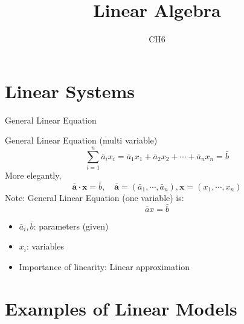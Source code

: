 \documentclass[a4paper,11pt]{article}
\author[조남운]{\mail}
\title{Linear Algebra}
\subtitle{CH6}
\begin{document}
	
\maketitle


\section{Linear Systems} %
\label{sec:linear_systems}
\begin{frame}[t]{General Linear Equation}
	\begin{block}
		{General Linear Equation (multi variable)}
		\[
			\sum_{i=1}^n \bar a_i x_i = \bar a_1 x_1 + \bar a_2 x_2 + \cdots + \bar a_n x_n = \bar b
		\]
		More elegantly,
		\[
			\bar{\mathbf{a}}\cdot \mathbf{x} = \bar b ,\quad \bar{\mathbf{a}}=(\bar a_1 ,\cdots,\bar a_n), \mathbf{x}=(x_1,\cdots,x_n)
		\]
		Note: General Linear Equation (one variable) is:
		\[
			\bar a x = \bar b
		\]
	\end{block}
	\begin{itemize}
		\item $\bar a_i, \bar b$: parameters (given)
		\item $x_i$: variables
		\item Importance of linearity: Linear approximation
	\end{itemize}
\end{frame}


\section{Examples of Linear Models} %
\label{sec:examples_of_linear_models}
\end{document}
